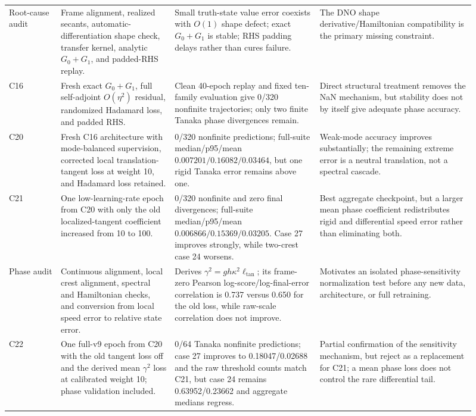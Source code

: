 \documentclass[11pt]{article}
\begin{document}
\begin{longtable}{@{}p{0.10\linewidth}p{0.22\linewidth}p{0.29\linewidth}p{0.30\linewidth}@{}}
Root-cause audit & Frame alignment, realized secants, automatic-differentiation
shape check, transfer kernel, analytic \(G_0+G_1\), and padded-RHS replay. &
Small truth-state value error coexists with \(O(1)\) shape defect; exact
\(G_0+G_1\) is stable; RHS padding delays rather than cures failure. & The DNO
shape derivative/Hamiltonian compatibility is the primary missing constraint. \\

C16 & Fresh exact \(G_0+G_1\), full self-adjoint \(O(\eta^2)\) residual,
randomized Hadamard loss, and padded RHS. & Clean 40-epoch replay and fixed
ten-family evaluation give 0/320 nonfinite trajectories; only two finite
Tanaka phase divergences remain. & Direct structural treatment removes the NaN
mechanism, but stability does not by itself give adequate phase accuracy. \\

C20 & Fresh C16 architecture with mode-balanced supervision, corrected local
translation-tangent loss at weight 10, and Hadamard loss retained. & 0/320
nonfinite predictions; full-suite median/p95/mean
\(0.007201/0.16082/0.03464\), but one rigid Tanaka error remains above one. &
Weak-mode accuracy improves substantially; the remaining extreme error is a
neutral translation, not a spectral cascade. \\

C21 & One low-learning-rate epoch from C20 with only the old localized-tangent
coefficient increased from 10 to 100. & 0/320 nonfinite and zero final
divergences; full-suite median/p95/mean
\(0.006866/0.15369/0.03205\).  Case 27 improves strongly, while two-crest case
24 worsens. & Best aggregate checkpoint, but a larger mean phase coefficient
redistributes rigid and differential speed error rather than eliminating both.
\\

Phase audit & Continuous alignment, local crest alignment, spectral and
Hamiltonian checks, and conversion from local speed error to relative state
error. & Derives \(\gamma^2=gh\kappa^2\ell_{\mathrm{tan}}\); its frame-zero
Pearson log-score/log-final-error correlation is 0.737 versus 0.650 for the old
loss, while raw-scale correlation does not improve. &
Motivates an isolated phase-sensitivity normalization test before any new data,
architecture, or full retraining. \\

C22 & One full-v9 epoch from C20 with the old tangent loss off and the derived
mean \(\gamma^2\) loss at calibrated weight 10; phase validation included. &
0/64 Tanaka nonfinite predictions; case 27 improves to 0.18047/0.02688 and the
raw threshold counts match C21, but case 24 remains 0.63952/0.23662 and
aggregate medians regress. & Partial confirmation of the sensitivity mechanism,
but reject as a replacement for C21; a mean phase loss does not control the
rare differential tail. \\
\bottomrule
\end{longtable}
\end{document}
